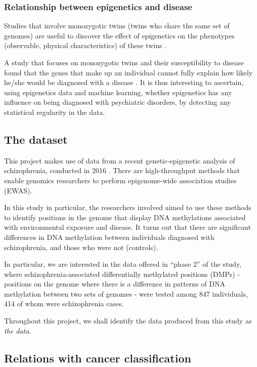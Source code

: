\documentclass[12pt, twoside, a4paper]{article}
\begin{document}
\subsubsection{Relationship between epigenetics and disease} \label{bg_epigenetics}
Studies that involve monozygotic twins (twins who share the same set of genomes) are useful to discover the effect of epigenetics on the phenotypes (observable, physical characteristics) of these twins \cite{RefWorks:104}.

A study that focuses on monozygotic twins and their susceptibility to disease found that the genes that make up an individual cannot fully explain how likely he/she would be diagnosed with a disease \cite{RefWorks:105}. It is thus interesting to ascertain, using epigenetics data and machine learning, whether epigenetics has any influence on being diagnosed with psychiatric disorders, by detecting any statistical regularity in the data.

\subsection{The dataset} \label{bg_genetic_data}
This project makes use of data from a recent genetic-epigenetic analysis of schizophrenia, conducted in 2016 \cite{RefWorks:78}. There are high-throughput methods that enable genomics researchers to perform epigenome-wide association studies (EWAS).

In this study in particular, the researchers involved aimed to use these methods to identify positions in the genome that display DNA methylations associated with environmental exposure and disease. It turns out that there are significant differences in DNA methylation between individuals diagnosed with schizophrenia, and those who were not (controls).

In particular, we are interested in the data offered in ``phase 2'' of the study, where schizophrenia-associated differentially methylated positions (DMPs) - positions on the genome where there is a difference in patterns of DNA methylation between two sets of genomes - were tested among 847 individuals, 414 of whom were schizophrenia cases.

Throughout this project, we shall identify the data produced from this study as \textit{the data}.

\subsection{Relations with cancer classification} \label{bg:cancer}
\end{document}
